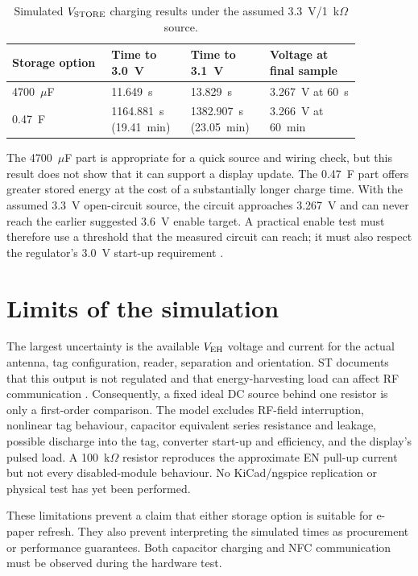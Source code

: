 \documentclass[11pt,a4paper]{article}
\begin{document}
\begin{table}[htbp]
\centering
\caption{Simulated $V_{\rm STORE}$ charging results under the assumed 3.3~V/1~k$\Omega$ source.}
\label{tab:results}
\begin{tabular}{p{0.25\linewidth}p{0.19\linewidth}p{0.19\linewidth}p{0.23\linewidth}}
\toprule
Storage option & Time to 3.0~V & Time to 3.1~V & Voltage at final sample \\
\midrule
4700~$\mu$F & 11.649~s & 13.829~s & 3.267~V at 60~s \\
0.47~F & 1164.881~s (19.41~min) & 1382.907~s (23.05~min) & 3.266~V at 60~min \\
\bottomrule
\end{tabular}
\end{table}

The 4700~$\mu$F part is appropriate for a quick source and wiring check, but this result does not show that it can support a display update. The 0.47~F part offers greater stored energy at the cost of a substantially longer charge time. With the assumed 3.3~V open-circuit source, the circuit approaches 3.267~V and can never reach the earlier suggested 3.6~V enable target. A practical enable test must therefore use a threshold that the measured circuit can reach; it must also respect the regulator's 3.0~V start-up requirement \cite{pololu-5712}.

\section{Limits of the simulation}
The largest uncertainty is the available $V_{\rm EH}$ voltage and current for the actual antenna, tag configuration, reader, separation and orientation. ST documents that this output is not regulated and that energy-harvesting load can affect RF communication \cite{st-an4913}. Consequently, a fixed ideal DC source behind one resistor is only a first-order comparison. The model excludes RF-field interruption, nonlinear tag behaviour, capacitor equivalent series resistance and leakage, possible discharge into the tag, converter start-up and efficiency, and the display's pulsed load. A 100~k$\Omega$ resistor reproduces the approximate EN pull-up current but not every disabled-module behaviour. No KiCad/ngspice replication or physical test has yet been performed.

These limitations prevent a claim that either storage option is suitable for e-paper refresh. They also prevent interpreting the simulated times as procurement or performance guarantees. Both capacitor charging and NFC communication must be observed during the hardware test.
\end{document}
